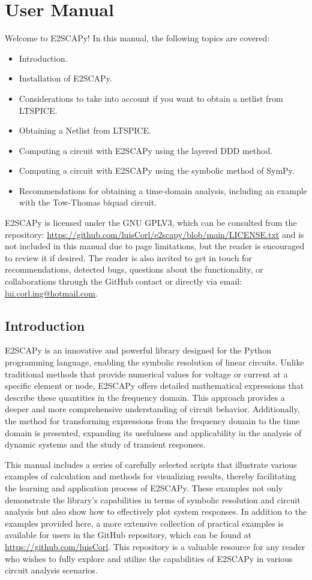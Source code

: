 \renewcommand{\thepage}{\roman{page}}
\chapter*{User Manual}
Welcome to E2SCAPy! In this manual, the following topics are covered:
\begin{itemize}
	\item Introduction.
	\item Installation of E2SCAPy.
	\item Considerations to take into account if you want to obtain a netlist from LTSPICE.
	\item Obtaining a Netlist from LTSPICE.
	\item Computing a circuit with E2SCAPy using the layered DDD method.
	\item Computing a circuit with E2SCAPy using the symbolic method of SymPy.
	\item Recommendations for obtaining a time-domain analysis, including an example with the Tow-Thomas biquad circuit.
\end{itemize}
E2SCAPy is licensed under the GNU GPLV3, which can be consulted from the repository: \url{https://github.com/luisCorl/e2scapy/blob/main/LICENSE.txt} and is not included in this manual due to page limitations, but the reader is encouraged to review it if desired. The reader is also invited to get in touch for recommendations, detected bugs, questions about the functionality, or collaborations through the GitHub contact or directly via email: \url{lui.corl.ing@hotmail.com}.
\section{Introduction}
E2SCAPy is an innovative and powerful library designed for the Python programming language, enabling the symbolic resolution of linear circuits. Unlike traditional methods that provide numerical values for voltage or current at a specific element or node, E2SCAPy offers detailed mathematical expressions that describe these quantities in the frequency domain. This approach provides a deeper and more comprehensive understanding of circuit behavior. Additionally, the method for transforming expressions from the frequency domain to the time domain is presented, expanding its usefulness and applicability in the analysis of dynamic systems and the study of transient responses.

\par This manual includes a series of carefully selected scripts that illustrate various examples of calculation and methods for visualizing results, thereby facilitating the learning and application process of E2SCAPy. These examples not only demonstrate the library's capabilities in terms of symbolic resolution and circuit analysis but also show how to effectively plot system responses. In addition to the examples provided here, a more extensive collection of practical examples is available for users in the GitHub repository, which can be found at \url{https://github.com/luisCorl}. This repository is a valuable resource for any reader who wishes to fully explore and utilize the capabilities of E2SCAPy in various circuit analysis scenarios.

